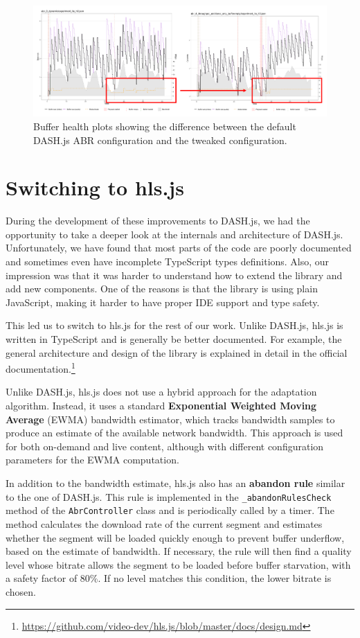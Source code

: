 \begin{figure}
    \centering
    \includegraphics[width=\textwidth]{res/impr_dashjs.png}
    \caption{Buffer health plots showing the difference between the default DASH.js ABR configuration and the tweaked configuration.}
    \label{fig:improvements_dashjs}
\end{figure}

\section{Switching to hls.js}
\label{sec:improvements/hlsjs}

During the development of these improvements to DASH.js, we had the opportunity to take a deeper look at the internals and architecture of DASH.js. Unfortunately, we have found that most parts of the code are poorly documented and sometimes even have incomplete TypeScript types definitions. Also, our impression was that it was harder to understand how to extend the library and add new components. One of the reasons is that the library is using plain JavaScript, making it harder to have proper IDE support and type safety.

This led us to switch to hls.js for the rest of our work. Unlike DASH.js, hls.js is written in TypeScript and is generally be better documented. For example, the general architecture and design of the library is explained in detail in the official documentation.\footnote{\url{https://github.com/video-dev/hls.js/blob/master/docs/design.md}}

Unlike DASH.js, hls.js does not use a hybrid approach for the adaptation algorithm. Instead, it uses a standard \textbf{Exponential Weighted Moving Average} (EWMA) bandwidth estimator, which tracks bandwidth samples to produce an estimate of the available network bandwidth. This approach is used for both on-demand and live content, although with different configuration parameters for the EWMA computation.

In addition to the bandwidth estimate, hls.js also has an \textbf{abandon rule} similar to the one of DASH.js. This rule is implemented in the \texttt{\_abandonRulesCheck} method of the \texttt{AbrController} class and is periodically called by a timer. The method calculates the download rate of the current segment and estimates whether the segment will be loaded quickly enough to prevent buffer underflow, based on the estimate of bandwidth. If necessary, the rule will then find a quality level whose bitrate allows the segment to be loaded before buffer starvation, with a safety factor of 80\%. If no level matches this condition, the lower bitrate is chosen.

